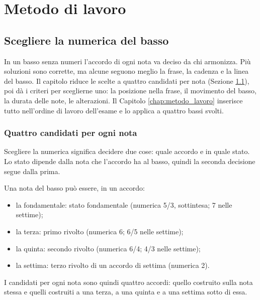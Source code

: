 \part{Metodo di lavoro}

\chapter{Scegliere la numerica del basso}
\label{chap:scegliere_numerica}

In un basso senza numeri l'accordo di ogni nota va deciso da chi armonizza. Più soluzioni sono corrette, ma alcune seguono meglio la frase, la cadenza e la linea del basso. Il capitolo riduce le scelte a quattro candidati per nota (Sezione \ref{sec:quattro_candidati}), poi dà i criteri per sceglierne uno: la posizione nella frase, il movimento del basso, la durata delle note, le alterazioni. Il Capitolo \ref{chap:metodo_lavoro} inserisce tutto nell'ordine di lavoro dell'esame e lo applica a quattro bassi svolti.

\section{Quattro candidati per ogni nota}
\label{sec:quattro_candidati}

Scegliere la numerica significa decidere due cose: quale accordo e in quale stato. Lo stato dipende dalla nota che l'accordo ha al basso, quindi la seconda decisione segue dalla prima.

\begin{regola}
	\label{reg:quattro_candidati}
	Una nota del basso può essere, in un accordo:
	\begin{itemize}
		\item la fondamentale: stato fondamentale (numerica 5/3, sottintesa; 7 nelle settime);
		\item la terza: primo rivolto (numerica 6; 6/5 nelle settime);
		\item la quinta: secondo rivolto (numerica 6/4; 4/3 nelle settime);
		\item la settima: terzo rivolto di un accordo di settima (numerica 2).
	\end{itemize}
	I candidati per ogni nota sono quindi quattro accordi: quello costruito sulla nota stessa e quelli costruiti a una terza, a una quinta e a una settima sotto di essa.
\end{regola}


